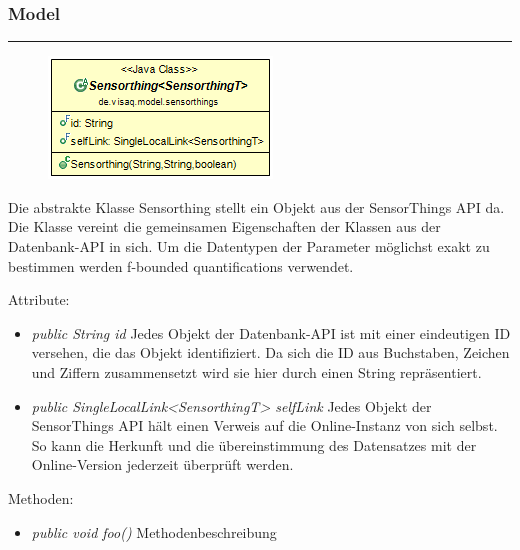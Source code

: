 \subsubsection{Model}
\newpage
\rule{\textwidth}{0.4pt}
\begin{minipage}{0.4\textwidth}
    \begin{figure}[H]
        {\centering\includegraphics[scale = 0.7]{media/backend/modell/classes/Sensorthing.png}}
    \end{figure}
    \end{minipage} \hfill
    \begin{minipage}{0.6\textwidth}
Die abstrakte Klasse Sensorthing stellt ein Objekt aus der \gls{SensorThings API} da.
Die Klasse vereint die gemeinsamen Eigenschaften der Klassen aus der Datenbank-\gls{API} in sich.
Um die Datentypen der Parameter möglichst exakt zu bestimmen werden \glspl{f-bounded quantification} verwendet.
\end{minipage}

Attribute:
\begin{itemize}
    \item \emph{public String id} Jedes Objekt der Datenbank-\gls{API} ist mit einer eindeutigen ID versehen, die das Objekt identifiziert.
    Da sich die ID aus Buchstaben, Zeichen und Ziffern zusammensetzt wird sie hier durch einen String repräsentiert.
    \item \emph{public SingleLocalLink<SensorthingT> selfLink} Jedes Objekt der \gls{SensorThings API} hält einen Verweis auf die Online-Instanz von sich selbst.
    So kann die Herkunft und die übereinstimmung des Datensatzes mit der Online-Version jederzeit überprüft werden.
\end{itemize}
Methoden: \begin{itemize} [noitemsep]
    \item \emph{public void foo()} Methodenbeschreibung
\end{itemize}